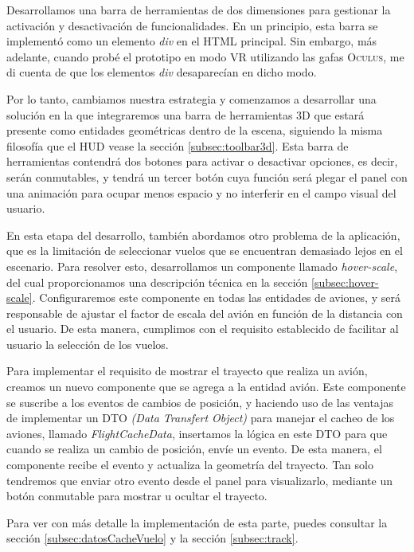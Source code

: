 \documentclass[a4paper, 11pt]{book}
\begin{document}
Desarrollamos una barra de herramientas de dos dimensiones para gestionar la activación y desactivación de funcionalidades. En un principio, esta barra se implementó como un elemento \emph{div} en el \textsc{HTML} principal. Sin embargo, más adelante, cuando probé el prototipo en modo \textsc{VR} utilizando las gafas \textsc{Oculus}, me di cuenta de que los elementos \emph{div} desaparecían en dicho modo.

Por lo tanto, cambiamos nuestra estrategia y comenzamos a desarrollar una solución en la que integraremos una barra de herramientas \textsc{3D} que estará presente como entidades geométricas dentro de la escena, siguiendo la misma filosofía que el \textsc{HUD} vease la sección \ref{subsec:toolbar3d}. Esta barra de herramientas contendrá dos botones para activar o desactivar opciones, es decir, serán conmutables, y tendrá un tercer botón cuya función será plegar el panel con una animación para ocupar menos espacio y no interferir en el campo visual del usuario.

En esta etapa del desarrollo, también abordamos otro problema de la aplicación, que es la limitación de seleccionar vuelos que se encuentran demasiado lejos en el escenario. Para resolver esto, desarrollamos un componente llamado \emph{hover-scale}, del cual proporcionamos una descripción técnica en la sección \ref{subsec:hover-scale}. Configuraremos este componente en todas las entidades de aviones, y será responsable de ajustar el factor de escala del avión en función de la distancia con el usuario. De esta manera, cumplimos con el requisito establecido de facilitar al usuario la selección de los vuelos.

Para implementar el requisito de mostrar el trayecto que realiza un avión, creamos un nuevo componente que se agrega a la entidad avión. Este componente se suscribe a los eventos de cambios de posición, y haciendo uso de las ventajas de implementar un \textsc{DTO} \emph{(Data Transfert Object)} para manejar el cacheo de los aviones, llamado \emph{FlightCacheData}, insertamos la lógica en este \textsc{DTO} para que cuando se realiza un cambio de posición, envíe un evento. De esta manera, el componente recibe el evento y actualiza la geometría del trayecto. Tan solo tendremos que enviar otro evento desde el panel para visualizarlo, mediante un botón conmutable para mostrar u ocultar el trayecto.

Para ver con más detalle la implementación de esta parte, puedes consultar la sección \ref{subsec:datosCacheVuelo} y la sección \ref{subsec:track}.
\end{document}
